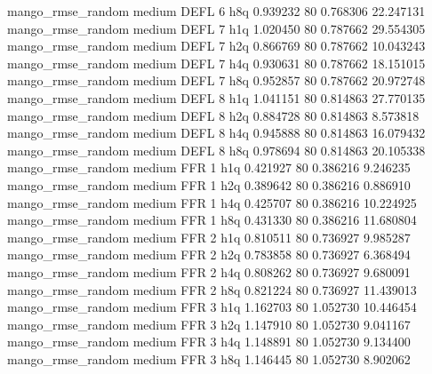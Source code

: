 mango_rmse_random     medium     DEFL                 6                  h8q  0.939232 80       0.768306          22.247131
mango_rmse_random     medium     DEFL                 7                  h1q  1.020450 80       0.787662          29.554305
mango_rmse_random     medium     DEFL                 7                  h2q  0.866769 80       0.787662          10.043243
mango_rmse_random     medium     DEFL                 7                  h4q  0.930631 80       0.787662          18.151015
mango_rmse_random     medium     DEFL                 7                  h8q  0.952857 80       0.787662          20.972748
mango_rmse_random     medium     DEFL                 8                  h1q  1.041151 80       0.814863          27.770135
mango_rmse_random     medium     DEFL                 8                  h2q  0.884728 80       0.814863           8.573818
mango_rmse_random     medium     DEFL                 8                  h4q  0.945888 80       0.814863          16.079432
mango_rmse_random     medium     DEFL                 8                  h8q  0.978694 80       0.814863          20.105338
mango_rmse_random     medium      FFR                 1                  h1q  0.421927 80       0.386216           9.246235
mango_rmse_random     medium      FFR                 1                  h2q  0.389642 80       0.386216           0.886910
mango_rmse_random     medium      FFR                 1                  h4q  0.425707 80       0.386216          10.224925
mango_rmse_random     medium      FFR                 1                  h8q  0.431330 80       0.386216          11.680804
mango_rmse_random     medium      FFR                 2                  h1q  0.810511 80       0.736927           9.985287
mango_rmse_random     medium      FFR                 2                  h2q  0.783858 80       0.736927           6.368494
mango_rmse_random     medium      FFR                 2                  h4q  0.808262 80       0.736927           9.680091
mango_rmse_random     medium      FFR                 2                  h8q  0.821224 80       0.736927          11.439013
mango_rmse_random     medium      FFR                 3                  h1q  1.162703 80       1.052730          10.446454
mango_rmse_random     medium      FFR                 3                  h2q  1.147910 80       1.052730           9.041167
mango_rmse_random     medium      FFR                 3                  h4q  1.148891 80       1.052730           9.134400
mango_rmse_random     medium      FFR                 3                  h8q  1.146445 80       1.052730           8.902062
